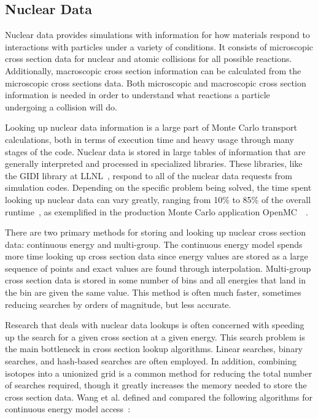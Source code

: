 \subsection{\textbf{Nuclear Data}}

Nuclear data provides simulations with information for how materials respond to interactions with particles under a variety of conditions.
%
It consists of microscopic cross section data for nuclear and atomic collisions for all possible reactions.
%
Additionally, macroscopic cross section information can be calculated from the microscopic cross sections data.
%
Both microscopic and macroscopic cross section information is needed in order to understand what reactions a particle undergoing a collision will do.
%

%
Looking up nuclear data information is a large part of Monte Carlo transport calculations, both in terms of execution time and heavy usage through many stages of the code.
%
Nuclear data is stored in large tables of information that are generally interpreted and processed in specialized libraries.
%
These libraries, like the GIDI library at LLNL~\cite{mckinley2015implementation}, respond to all of the nuclear data requests from simulation codes.
%
Depending on the specific problem being solved, the time spent looking up nuclear data can vary greatly, ranging from 10\% to 85\% of the overall runtime~\cite{tramm2014xsbench}, as exemplified in the production Monte Carlo application OpenMC~\cite{romano2013openmc}~\cite{romano2015openmc}.

There are two primary methods for storing and looking up nuclear cross section data: continuous energy and multi-group.
%
The continuous energy model spends more time looking up cross section data since energy values are stored as a large sequence of points and exact values are found through interpolation.
%
Multi-group cross section data is stored in some number of bins and all energies that land in the bin are given the same value. 
%
This method is often much faster, sometimes reducing searches by orders of magnitude, but less accurate.
%

%
Research that deals with nuclear data lookups is often concerned with speeding up the search for a given cross section at a given energy.
%
This search problem is the main bottleneck in cross section lookup algorithms.
%
Linear searches, binary searches, and hash-based searches are often employed.
%
In addition, combining isotopes into a unionized grid is a common method for reducing the total number of searches required, though it greatly increases the memory needed to store the cross section data.
%
Wang et al. defined and compared the following algorithms for continuous energy model access~\cite{wang2016competing}:
%
